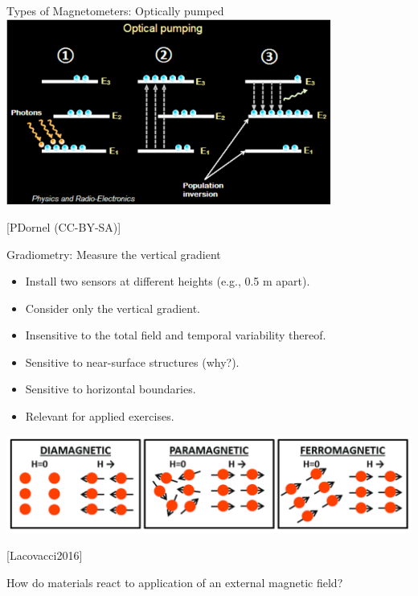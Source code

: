  \begin{frame}{Types of Magnetometers: Optically pumped}
     \includegraphics[width=0.8\textwidth]{Figures/Magnetics/OpticallyPumped_PDornel.png}
 
     \tiny [PDornel (CC-BY-SA)]
 \end{frame}

\begin{frame}
  \begin{PointSix}{Gradiometry: Measure the vertical gradient}
   \begin{itemize}
    \item Install two sensors at different heights (e.g., 0.5 m apart).
    \item Consider only the vertical gradient.
    \item Insensitive to the total field and temporal variability thereof.
    \item Sensitive to near-surface structures (why?).
    \item Sensitive to horizontal boundaries.
    \item \alert{Relevant for applied exercises.}
   \end{itemize}
  \end{PointSix}
\end{frame}



\begin{frame}
  \begin{center}
    \includegraphics[width=0.7\linewidth]{Figures/Magnetics/ParaDiaFerro_Lacovacci2016.png}
  
    \tiny[Lacovacci2016]

    \vspace{2cm}
    
    \normalsize How do materials react to application of an external magnetic field?
  \end{center}
\end{frame}

